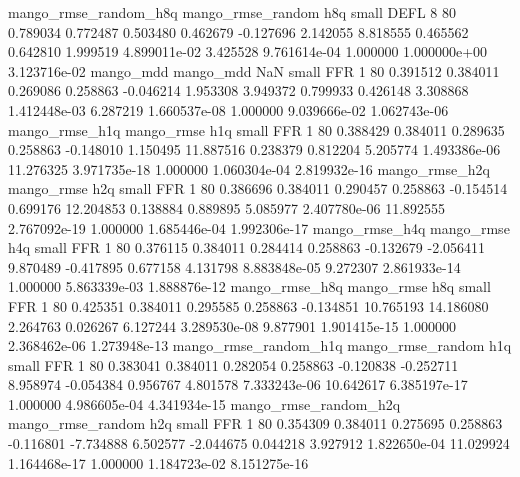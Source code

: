 mango_rmse_random_h8q mango_rmse_random                  h8q      small     DEFL                 8 80 0.789034       0.772487 0.503480       0.462679   -0.127696      2.142055      8.818555     0.465562       0.642810  1.999519 4.899011e-02     3.425528   9.761614e-04            1.000000    1.000000e+00        3.123716e-02
            mango_mdd         mango_mdd                  NaN      small      FFR                 1 80 0.391512       0.384011 0.269086       0.258863   -0.046214      1.953308      3.949372     0.799933       0.426148  3.308868 1.412448e-03     6.287219   1.660537e-08            1.000000    9.039666e-02        1.062743e-06
       mango_rmse_h1q        mango_rmse                  h1q      small      FFR                 1 80 0.388429       0.384011 0.289635       0.258863   -0.148010      1.150495     11.887516     0.238379       0.812204  5.205774 1.493386e-06    11.276325   3.971735e-18            1.000000    1.060304e-04        2.819932e-16
       mango_rmse_h2q        mango_rmse                  h2q      small      FFR                 1 80 0.386696       0.384011 0.290457       0.258863   -0.154514      0.699176     12.204853     0.138884       0.889895  5.085977 2.407780e-06    11.892555   2.767092e-19            1.000000    1.685446e-04        1.992306e-17
       mango_rmse_h4q        mango_rmse                  h4q      small      FFR                 1 80 0.376115       0.384011 0.284414       0.258863   -0.132679     -2.056411      9.870489    -0.417895       0.677158  4.131798 8.883848e-05     9.272307   2.861933e-14            1.000000    5.863339e-03        1.888876e-12
       mango_rmse_h8q        mango_rmse                  h8q      small      FFR                 1 80 0.425351       0.384011 0.295585       0.258863   -0.134851     10.765193     14.186080     2.264763       0.026267  6.127244 3.289530e-08     9.877901   1.901415e-15            1.000000    2.368462e-06        1.273948e-13
mango_rmse_random_h1q mango_rmse_random                  h1q      small      FFR                 1 80 0.383041       0.384011 0.282054       0.258863   -0.120838     -0.252711      8.958974    -0.054384       0.956767  4.801578 7.333243e-06    10.642617   6.385197e-17            1.000000    4.986605e-04        4.341934e-15
mango_rmse_random_h2q mango_rmse_random                  h2q      small      FFR                 1 80 0.354309       0.384011 0.275695       0.258863   -0.116801     -7.734888      6.502577    -2.044675       0.044218  3.927912 1.822650e-04    11.029924   1.164468e-17            1.000000    1.184723e-02        8.151275e-16
